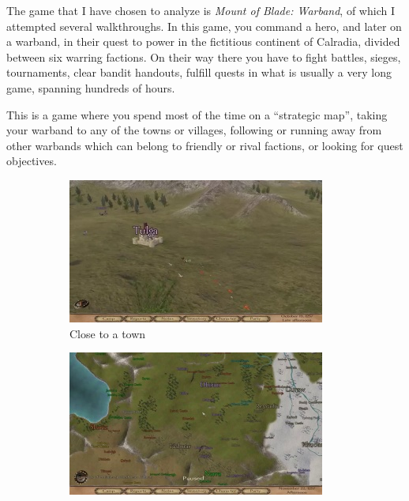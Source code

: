 \documentclass[
]{article}
\begin{document}
The game that I have chosen to analyze is \emph{Mount of Blade:
Warband}, of which I attempted several walkthroughs. In this game, you command a hero, and later on a warband,  in their quest to power in the fictitious continent of Calradia, divided between six warring factions. On their way there you have to fight battles, sieges, tournaments, clear bandit handouts, fulfill quests in what is usually a very long game, spanning hundreds of hours.

This is a game where you spend most of the time on a ``strategic map'', taking your warband to
any of the towns or villages, following or running away from other
warbands which can belong to friendly or rival factions, or looking for
quest objectives.


\begin{figure}[H]
	\centering
	\begin{subfigure}[b]{0.3\textwidth}
		\includegraphics[width=\linewidth]{docimages/E_0041_00_09_28.jpg}
		\caption{Close to a town}
	\end{subfigure}
	\begin{subfigure}[b]{0.3\textwidth}
		\includegraphics[width=\linewidth]{docimages/E_0049_00_15_38.jpg}

\end{subfigure}
\end{figure}
\end{document}
